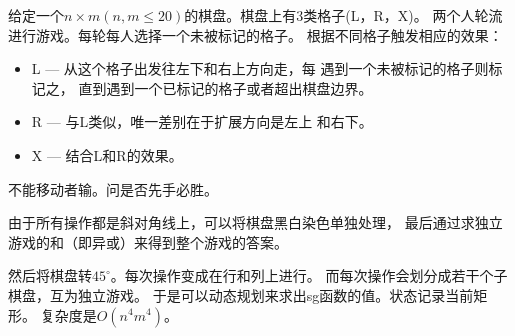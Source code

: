 \begin{prob}
	给定一个$n \times m (n,m \le 20)$的棋盘。棋盘上有3类格子(L，R，X)。
	两个人轮流进行游戏。每轮每人选择一个未被标记的格子。
	根据不同格子触发相应的效果：
	\begin{itemize}
		\item L --- 从这个格子出发往左下和右上方向走，每
			遇到一个未被标记的格子则标记之，
			直到遇到一个已标记的格子或者超出棋盘边界。
		\item R --- 与L类似，唯一差别在于扩展方向是左上
			和右下。
		\item X --- 结合L和R的效果。
	\end{itemize}
	不能移动者输。问是否先手必胜。
\end{prob}

\begin{sol}
	由于所有操作都是斜对角线上，可以将棋盘黑白染色单独处理，
	最后通过求独立游戏的和（即异或）来得到整个游戏的答案。
	\par
	然后将棋盘转$45^{\circ}$。每次操作变成在行和列上进行。
	而每次操作会划分成若干个子棋盘，互为独立游戏。
	于是可以动态规划来求出sg函数的值。状态记录当前矩形。
	复杂度是$O(n^4m^4)$。
\end{sol}
